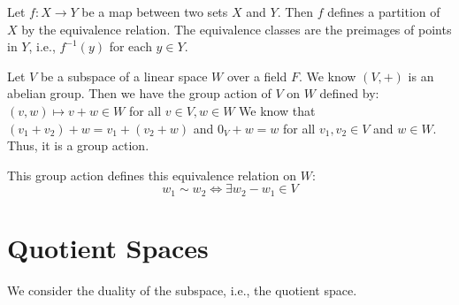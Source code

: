 \documentclass[
	11pt, %
	fleqn, %
	a4paper, %
]{LegrandOrangeBook}
\begin{document}
\begin{proposition}
    Let $f : X \to Y$ be a map between two sets $X$ and $Y$. Then $f$ defines a partition of $X$ by the equivalence relation. The equivalence classes are the preimages of points in $Y$, i.e., $f^{-1}(y)$ for each $y \in Y$.
\end{proposition}

\newpage

\begin{example}
    Let $V$ be a subspace of a linear space $W$ over a field $F$. We know $(V, +)$ is an abelian group. Then we have the group action of $V$ on $W$ defined by: $(v, w) \mapsto v + w \in W$ \quad for all $v \in V, w \in W$
    We know that $(v_1 + v_2) + w = v_1 + (v_2 + w)$ and $0_V + w = w$ for all $v_1, v_2 \in V$ and $w \in W$. Thus, it is a group action. 
    
    \begin{center}
    \end{center}
\end{example}

This group action defines this equivalence relation on $W$:
\[
    w_1 \sim w_2 \iff \exists w_2 - w_1 \in V
\]

\newpage

\section{Quotient Spaces}

We consider the duality of the subspace, i.e., the quotient space.

\begin{definition}[Quotient Spaces]
\end{definition}
\end{document}
